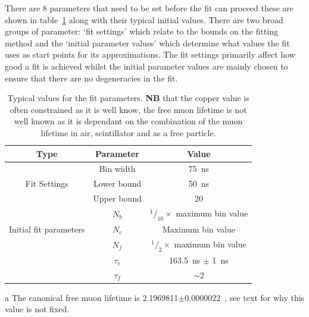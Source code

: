 There are 8 parameters that need to be set before the fit can proceed these are shown in table~\ref{tab:typical_fit_values} along with their typical initial values. There are two broad groups of parameter: `fit settings' which relate to the bounds on the fitting method and the `initial parameter values' which determine what values the fit uses as start points for its approximations. The fit settings primarily affect how good a fit is achieved whilst the initial parameter values are mainly chosen to ensure that there are no degeneracies in the fit. 

\begin{table}
    \begin{center}
	    \begin{threeparttable}
		    \begin{tabular}{c | c | c }
		        Type & Parameter   & Value \\
		        \hline
		        \multirow{3}{*}{Fit Settings} & Bin width   & 75~ns \\
		                                      & Lower bound & 50~ns \\
		                                      & Upper bound & 20\mus \\
		        \hline
		        \multirow{3}{*}{Initial fit parameters} 
		                    & $N_{b}$     & $^1/_{10} \times$ maximum bin value \\
		                    & $N_{c}$     & Maximum bin value\\
		                    & $N_{f}$     & $^1/_{2} \times$ maximum bin value\\
		                    & $\tau_{c}$  & 163.5~ns $\pm$ 1~ns\\
		                    & $\tau_{f}$  & $\sim$2\mus\tnote{a}\\
		    \end{tabular}
		    \caption{Typical values for the fit parameters. \textbf{NB} that the copper value is often constrained as it is well know, the free muon lifetime is not well known as it is dependant on the combination of the muon lifetime in air, scintillator and as a free particle.}
		    \begin{tablenotes}
		        \item [a] The canonical free muon lifetime is 2.1969811$\pm$0.0000022\mus~\cite{Beringer2012}, see text for why this value is not fixed.
		    \end{tablenotes}
		    \label{tab:typical_fit_values}
	    \end{threeparttable}
    \end{center}
\end{table}
